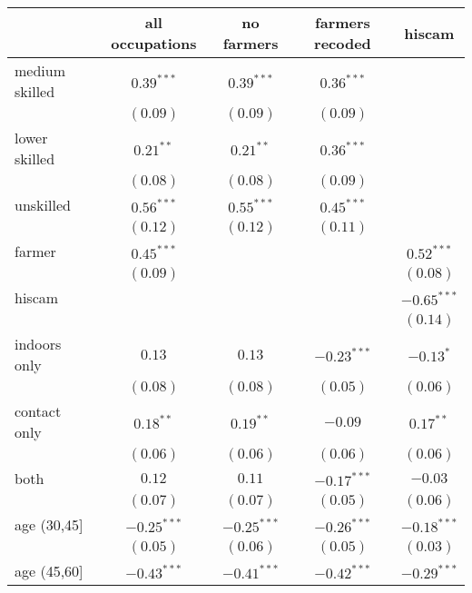 
\begin{table}
\begin{center}
\begin{tabular}{l c c c c}
\hline
 & all occupations & no farmers & farmers recoded & hiscam \\
\hline
medium skilled & $0.39^{***}$  & $0.39^{***}$  & $0.36^{***}$  &               \\
               & $(0.09)$      & $(0.09)$      & $(0.09)$      &               \\
lower skilled  & $0.21^{**}$   & $0.21^{**}$   & $0.36^{***}$  &               \\
               & $(0.08)$      & $(0.08)$      & $(0.09)$      &               \\
unskilled      & $0.56^{***}$  & $0.55^{***}$  & $0.45^{***}$  &               \\
               & $(0.12)$      & $(0.12)$      & $(0.11)$      &               \\
farmer         & $0.45^{***}$  &               &               & $0.52^{***}$  \\
               & $(0.09)$      &               &               & $(0.08)$      \\
hiscam         &               &               &               & $-0.65^{***}$ \\
               &               &               &               & $(0.14)$      \\
indoors only   & $0.13$        & $0.13$        & $-0.23^{***}$ & $-0.13^{*}$   \\
               & $(0.08)$      & $(0.08)$      & $(0.05)$      & $(0.06)$      \\
contact only   & $0.18^{**}$   & $0.19^{**}$   & $-0.09$       & $0.17^{**}$   \\
               & $(0.06)$      & $(0.06)$      & $(0.06)$      & $(0.06)$      \\
both           & $0.12$        & $0.11$        & $-0.17^{***}$ & $-0.03$       \\
               & $(0.07)$      & $(0.07)$      & $(0.05)$      & $(0.06)$      \\
age (30,45]    & $-0.25^{***}$ & $-0.25^{***}$ & $-0.26^{***}$ & $-0.18^{***}$ \\
               & $(0.05)$      & $(0.06)$      & $(0.05)$      & $(0.03)$      \\
age (45,60]    & $-0.43^{***}$ & $-0.41^{***}$ & $-0.42^{***}$ & $-0.29^{***}$ \\

\end{tabular}
\end{center}
\end{table}
